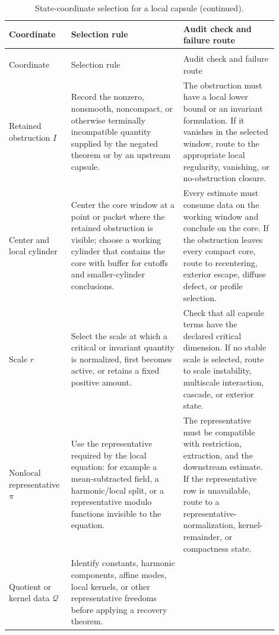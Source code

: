 \documentclass[11pt]{article}
\theoremstyle{plain}
\theoremstyle{definition}
\theoremstyle{remark}
\begin{document}
\begingroup
\small
\begin{longtable}{@{}L{0.18\linewidth}L{0.39\linewidth}L{0.33\linewidth}@{}}
\caption{State-coordinate selection for a local capsule.}
\label{tab:state-coordinate-selection}\\
\toprule
Coordinate & Selection rule & Audit check and failure route \\
\midrule
\endfirsthead
\caption[]{State-coordinate selection for a local capsule (continued).}\\
\toprule
Coordinate & Selection rule & Audit check and failure route \\
\midrule
\endhead
Retained obstruction \(I\) &
Record the nonzero, nonsmooth, noncompact, or otherwise terminally incompatible
quantity supplied by the negated theorem or by an upstream capsule. &
The obstruction must have a local lower bound or an invariant formulation.  If
it vanishes in the selected window, route to the appropriate local regularity,
vanishing, or no-obstruction closure. \\
\addlinespace
Center and local cylinder &
Center the core window at a point or packet where the retained obstruction is
visible; choose a working cylinder that contains the core with buffer for
cutoffs and smaller-cylinder conclusions. &
Every estimate must consume data on the working window and conclude on the
core.  If the obstruction leaves every compact core, route to recentering,
exterior escape, diffuse defect, or profile selection. \\
\addlinespace
Scale \(r\) &
Select the scale at which a critical or invariant quantity is normalized,
first becomes active, or retains a fixed positive amount. &
Check that all capsule terms have the declared critical dimension.  If no
stable scale is selected, route to scale instability, multiscale interaction,
cascade, or exterior state. \\
\addlinespace
Nonlocal representative \(\pi\) &
Use the representative required by the local equation: for example a
mean-subtracted field, a harmonic/local split, or a representative modulo
functions invisible to the equation. &
The representative must be compatible with restriction, extraction, and the
downstream estimate.  If the representative row is unavailable, route to a
representative-normalization, kernel-remainder, or compactness state. \\
\addlinespace
Quotient or kernel data \(\mathcal Q\) &
Identify constants, harmonic components, affine modes, local kernels, or other
representative freedoms before applying a recovery theorem. &

\end{longtable}
\end{document}
